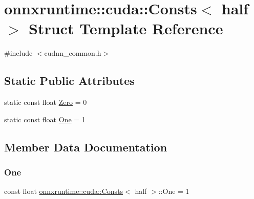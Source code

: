 \hypertarget{structonnxruntime_1_1cuda_1_1Consts_3_01half_01_4}{}\section{onnxruntime\+:\+:cuda\+:\+:Consts$<$ half $>$ Struct Template Reference}
\label{structonnxruntime_1_1cuda_1_1Consts_3_01half_01_4}


{\ttfamily \#include $<$cudnn\+\_\+common.\+h$>$}

\subsection*{Static Public Attributes}
\begin{DoxyCompactItemize}
\item 
static const float \mbox{\hyperlink{structonnxruntime_1_1cuda_1_1Consts_3_01half_01_4_aa3710ba60dece1dfa19a4d258b7c6791}{Zero}} = 0
\item 
static const float \mbox{\hyperlink{structonnxruntime_1_1cuda_1_1Consts_3_01half_01_4_a6d2fb492751f50e8a62a904b8a08b636}{One}} = 1
\end{DoxyCompactItemize}


\subsection{Member Data Documentation}
\mbox{\label{structonnxruntime_1_1cuda_1_1Consts_3_01half_01_4_a6d2fb492751f50e8a62a904b8a08b636}} 
\subsubsection{\texorpdfstring{One}{One}}
{\footnotesize\ttfamily const float \mbox{\hyperlink{structonnxruntime_1_1cuda_1_1Consts}{onnxruntime\+::cuda\+::\+Consts}}$<$ half $>$\+::One = 1\hspace{0.3cm}{\ttfamily [static]}}

\mbox{\label{structonnxruntime_1_1cuda_1_1Consts_3_01half_01_4_aa3710ba60dece1dfa19a4d258b7c6791}} 
